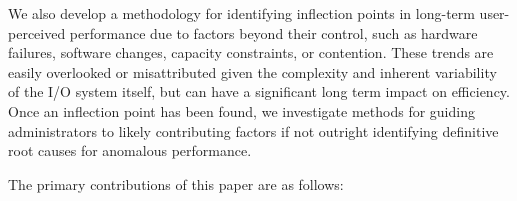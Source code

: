We also develop a methodology for identifying inflection points in
long-term user-perceived performance due to factors beyond their control,
such as hardware failures, software changes, capacity constraints, or
contention.  These trends are easily overlooked or misattributed given the
complexity and inherent variability of the I/O system itself, but can have a
significant long term impact on efficiency.  Once an inflection point has
been found, we investigate methods for guiding administrators to likely
contributing factors if not outright identifying definitive root causes for
anomalous performance.


The primary contributions of this paper are as follows: 


